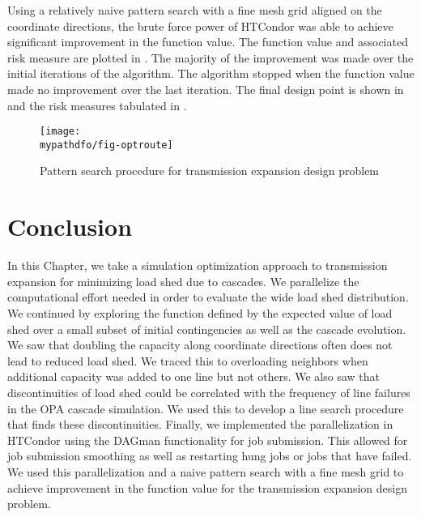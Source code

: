 Using a relatively naive pattern search with a fine mesh grid aligned on the coordinate directions, the brute force power of HTCondor was able to achieve significant improvement in the function value.  The function value and associated risk measure are plotted in .  The majority of the improvement was made over the initial iterations of the algorithm.  The algorithm stopped when the function value made no improvement over the last iteration.  The final design point is shown in  and the risk measures tabulated in .


\linespread{1}


\linespread{2}


\begin{figure}
\begin{center}
\texttt{[image: \\mypathdfo/fig-optroute]}
 \caption{Pattern search procedure for transmission expansion design problem}
 \label{fig:opt1}
\end{center}
\end{figure}






\section{Conclusion}
In this Chapter, we take a simulation optimization approach to transmission expansion for minimizing load shed due to cascades. We parallelize the computational effort needed in order to evaluate the wide load shed distribution.  We continued by exploring the function defined by the expected value of load shed over a small subset of initial contingencies as well as the cascade evolution.  We saw that doubling the capacity along coordinate directions often does not lead to reduced load shed.  We traced this to overloading neighbors when additional capacity was added to one line but not others.  We also saw that discontinuities of load shed could be correlated with the frequency of line failures in the OPA cascade simulation.  We used this to develop a line search procedure that finds these discontinuities. Finally, we implemented the parallelization in HTCondor using the DAGman functionality for job submission.  This allowed for job submission smoothing as well as restarting hung jobs or jobs that have failed.  We used this parallelization and a naive pattern search with a fine mesh grid to achieve improvement in the function value for the transmission expansion design problem.



